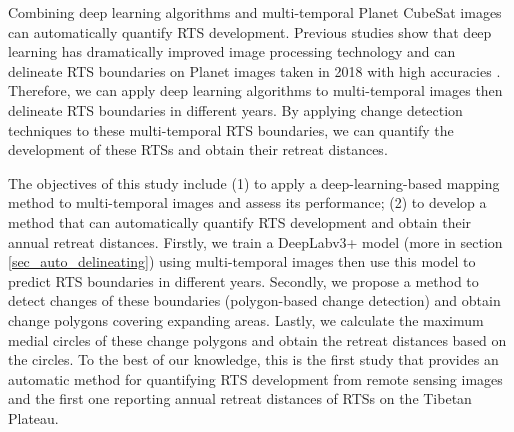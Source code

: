 \documentclass[authoryear,preprint,review,12pt]{elsarticle}
\begin{document}
Combining deep learning algorithms and multi-temporal Planet CubeSat images can automatically quantify RTS development.
Previous studies show that deep learning has dramatically improved image processing technology \citep{leCun2015Deep} and can delineate RTS boundaries on Planet images taken in 2018 with high accuracies \citep{huang2020using}. 
Therefore, we can apply deep learning algorithms to multi-temporal images then delineate RTS boundaries in different years.
By applying %
change detection techniques to these multi-temporal RTS boundaries, we can quantify the development of these RTSs and obtain their retreat distances. 


The objectives of this study include (1) to apply a deep-learning-based mapping method to multi-temporal images and assess its performance; (2) to develop a method that can automatically quantify RTS development 
and obtain their annual retreat distances.
Firstly, we train a DeepLabv3+ model (more in section \ref{sec_auto_delineating}) using multi-temporal images then use this model to predict RTS boundaries in different years.
Secondly, we propose a method to detect changes of these boundaries (polygon-based change detection)  and obtain change polygons covering expanding areas.
Lastly, we calculate the maximum medial circles of these change polygons and obtain the retreat distances based on the circles.  
To the best of our knowledge, this is the first study that provides an automatic method for quantifying RTS development from remote sensing images and the first one reporting annual retreat distances of RTSs on the Tibetan Plateau. 

\end{document}
